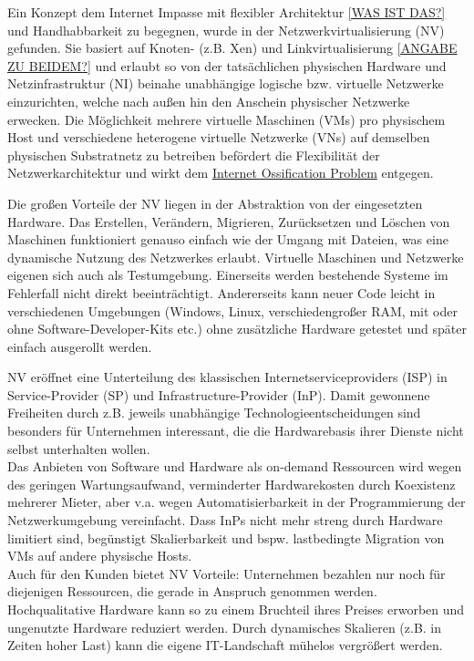 Ein Konzept dem Internet Impasse mit flexibler Architektur \underline{[WAS IST DAS?]} und Handhabbarkeit zu begegnen, wurde in der Netzwerkvirtualisierung (NV) gefunden. \cite{anderson2005overcoming, bays2012security, fischer2013virtual} Sie basiert auf Knoten- (z.B. Xen) und Linkvirtualisierung \underline{[ANGABE ZU BEIDEM?]} und erlaubt so von der tatsächlichen physischen Hardware und Netzinfrastruktur (NI) beinahe unabhängige logische bzw. virtuelle Netzwerke einzurichten, welche nach außen hin den Anschein physischer Netzwerke erwecken. Die Möglichkeit mehrere virtuelle Maschinen (VMs) pro physischem Host und verschiedene heterogene virtuelle Netzwerke (VNs) auf demselben physischen Substratnetz zu betreiben befördert die Flexibilität der Netzwerkarchitektur und wirkt dem \underline{Internet Ossification Problem} \cite{anderson2005overcoming} entgegen.

Die großen Vorteile der NV liegen in der Abstraktion von der eingesetzten Hardware. Das Erstellen, Verändern, Migrieren, Zurücksetzen und Löschen von Maschinen funktioniert genauso einfach wie der Umgang mit Dateien, was eine dynamische Nutzung des Netzwerkes erlaubt. Virtuelle Maschinen und Netzwerke eigenen sich auch als Testumgebung. Einerseits werden bestehende Systeme im Fehlerfall nicht direkt beeinträchtigt. Andererseits kann neuer Code leicht in verschiedenen Umgebungen (Windows, Linux, verschiedengroßer RAM, mit oder ohne Software-Developer-Kits etc.) ohne zusätzliche Hardware getestet und später einfach ausgerollt werden.

NV eröffnet eine Unterteilung des klassischen Internetserviceproviders (ISP) in Service-Provider (SP) und Infrastructure-Provider (InP). Damit gewonnene Freiheiten durch z.B. jeweils unabhängige Technologieentscheidungen sind besonders für Unternehmen interessant, die die Hardwarebasis ihrer Dienste nicht selbst unterhalten wollen.  \cite{wang2016towards}\\
Das Anbieten von Software und Hardware als on-demand Ressourcen wird wegen des geringen Wartungsaufwand, verminderter Hardwarekosten durch Koexistenz mehrerer Mieter, aber v.a. wegen Automatisierbarkeit in der Programmierung der Netzwerkumgebung vereinfacht. Dass InPs nicht mehr streng durch Hardware limitiert sind, begünstigt Skalierbarkeit und bspw. lastbedingte Migration von VMs auf andere physische Hosts.\\
Auch für den Kunden bietet NV Vorteile: Unternehmen bezahlen nur noch für diejenigen Ressourcen, die gerade in Anspruch genommen werden. Hochqualitative Hardware kann so zu einem Bruchteil ihres Preises erworben und ungenutzte Hardware reduziert werden. Durch dynamisches Skalieren (z.B. in Zeiten hoher Last) kann die eigene IT-Landschaft mühelos vergrößert werden.

